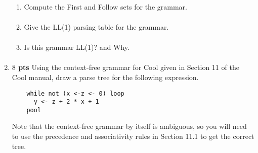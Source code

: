 \documentclass[10pt]{article}
\newcommand {\pts}[1]{{\bf #1 pts}}
\begin{document}
\begin{enumerate}
\begin{enumerate}
  \item Compute the First and Follow sets for the grammar.
            \begin{equation*}\begin{aligned}
            \end{aligned}\end{equation*}
  \item Give the LL(1) parsing table for the grammar.
             \begin{equation*}\begin{aligned}
            \end{aligned}\end{equation*}
  \item Is this grammar LL(1)? and Why.
             \begin{equation*}\begin{aligned}
            \end{aligned}\end{equation*}
\end{enumerate}

\item \pts{$8$}  Using the context-free grammar for Cool given in Section 11 of the Cool
manual, draw a parse tree for the following expression.
  \begin{lstlisting}
    while not (x <-z <- 0) loop
      y <- z + 2 * x + 1
    pool
  \end{lstlisting}
Note that the context-free grammar by itself is ambiguous, so you will
need to use the precedence and associativity rules in Section 11.1 to
get the correct tree. \\
        \begin{center}
\end{center}
\end{enumerate}
\end{document}
